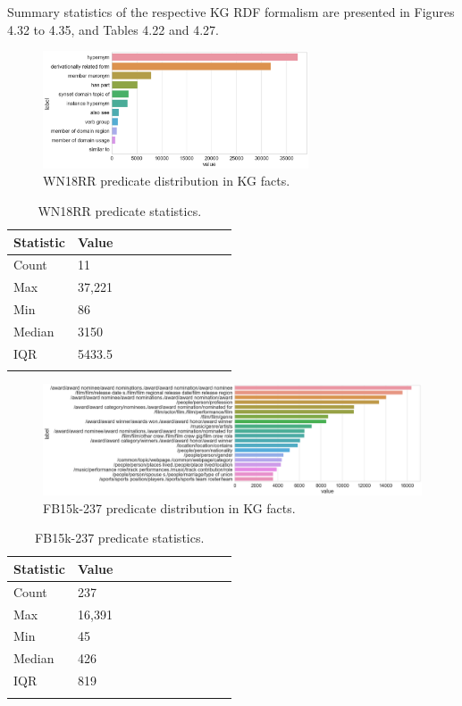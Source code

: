 \noindent Summary statistics of the respective KG RDF formalism are presented in Figures 4.32 to 4.35, and Tables 4.22 and 4.27.

\begin{figure}[H]
   	\centering
    	\includegraphics[width=0.7\textwidth, height=0.2\textheight]{WN18RR_Predicate_Counts}
	\caption{WN18RR predicate distribution in KG facts.}
\end{figure}

\begin{table}[H]
		\centering
		\begin{tabular}{lllllllllll}
  			\textbf{Statistic} & \textbf{Value}  \\
  			\hline
			Count & 11 \\
			Max & 37,221  \\
			Min & 86 \\
  			Median & 3150  \\
  			IQR & 5433.5  \\
			&
		\end{tabular}
		\caption{WN18RR predicate statistics.}
\end{table}

\begin{figure}[H]
   	\centering
    	\includegraphics[width=1.0\textwidth, height=0.3\textheight]{FB15k-237_Predicate_Counts}
	\caption{FB15k-237 predicate distribution in KG facts.}
\end{figure}

\begin{table}[H]
		\centering
		\begin{tabular}{lllllllllll}
  			\textbf{Statistic} & \textbf{Value}  \\
  			\hline
			Count & 237 \\
			Max & 16,391 \\
			Min & 45  \\
  			Median & 426  \\
  			IQR & 819 \\
			&
		\end{tabular}
		\caption{FB15k-237 predicate statistics.}
\end{table}

